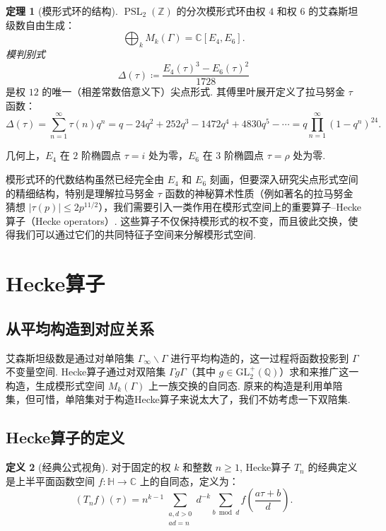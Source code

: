 \documentclass[10pt,UTF8]{ctexart}
\newcommand{\C}{\mathbb{C}}
\newcommand{\Z}{\mathbb{Z}}
\newcommand{\Q}{\mathbb{Q}}
\newcommand{\HH}{\mathbb{H}} %
\newcommand{\PSL}{\operatorname{PSL}_2(\Z)}
\theoremstyle{definition}
\newtheorem{theorem}{定理}[section]
\newtheorem{definition}[theorem]{定义}
\theoremstyle{remark}
\begin{document}
\begin{theorem}[模形式环的结构]
$\PSL$ 的分次模形式环由权 $4$ 和权 $6$ 的艾森斯坦级数自由生成：
\[
\bigoplus_{k} M_k(\Gamma) = \C[E_4, E_6].
\]
\emph{模判别式}
\[
\Delta(\tau) \coloneqq \frac{E_4(\tau)^3 - E_6(\tau)^2}{1728}
\]
是权 $12$ 的唯一（相差常数倍意义下）尖点形式. 其傅里叶展开定义了拉马努金 $\tau$ 函数：
\[
\Delta(\tau) = \sum_{n=1}^\infty \tau(n) q^n = q - 24q^2 + 252q^3 - 1472q^4 + 4830q^5 - \cdots = q\prod_{n=1}^\infty (1-q^n)^{24}.
\]
\end{theorem}

几何上，$E_4$ 在 $2$ 阶椭圆点 $\tau=i$ 处为零，$E_6$ 在 $3$ 阶椭圆点 $\tau=\rho$ 处为零. 

模形式环的代数结构虽然已经完全由 $E_4$ 和 $E_6$ 刻画，但要深入研究尖点形式空间的精细结构，特别是理解拉马努金 $\tau$ 函数的神秘算术性质（例如著名的拉马努金猜想 $\vert\tau(p)\vert\leq 2p^{11/2}$），我们需要引入一类作用在模形式空间上的重要算子--Hecke算子（Hecke operators）.
这些算子不仅保持模形式的权不变，而且彼此交换，使得我们可以通过它们的共同特征子空间来分解模形式空间. 



\section{Hecke算子}

\subsection{从平均构造到对应关系}

艾森斯坦级数是通过对单陪集 $\Gamma_\infty\backslash\Gamma$ 进行平均构造的，这一过程将函数投影到 $\Gamma$ 不变量空间. Hecke算子通过对双陪集 $\Gamma g \Gamma$（其中 $g\in\mathrm{GL}_2^+(\Q)$）求和来推广这一构造，生成模形式空间 $M_k(\Gamma)$ 上一族交换的自同态. 原来的构造是利用单陪集，但可惜，单陪集对于构造Hecke算子来说太大了，我们不妨考虑一下双陪集. 


\subsection{Hecke算子的定义}



\begin{definition}[经典公式视角]
对于固定的权 $k$ 和整数 $n\geq 1$, Hecke算子 $T_n$ 的经典定义 是上半平面函数空间 $f:\HH\to\C$ 上的自同态，定义为：
\[
\displaystyle (T_n f)(\tau) = n^{k-1}\sum_{\substack{a,d>0\\ ad=n}} d^{-k}\sum_{b\bmod d} f\!\left(\frac{a\tau+b}{d}\right).
\]

\end{definition}
\end{document}

